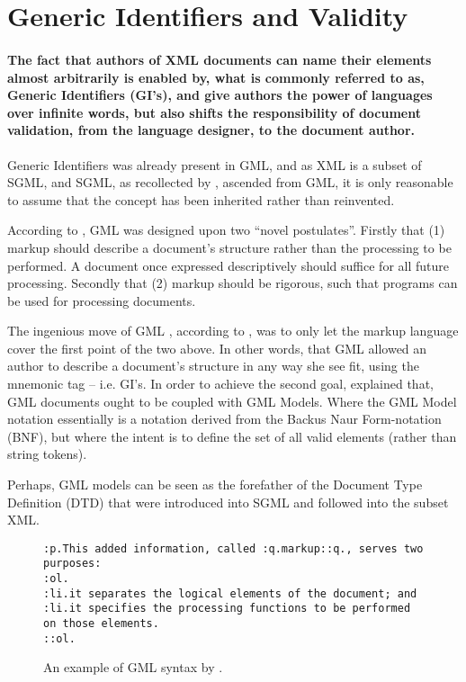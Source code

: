 \documentclass{scrreprt}
\begin{document}
\section{Generic Identifiers and Validity}
\label{sec:theory:generic-identifiers-and-validity}

\paragraph{The fact that authors of XML documents can name their elements almost arbitrarily is enabled by, what is commonly referred to as, Generic Identifiers (GI's), and give authors the power of languages over infinite words, but also shifts the responsibility of document validation, from the language designer, to the document author.}

Generic Identifiers was already present in GML, and as XML is a subset of SGML\citep{xmlFirstWorkingDraft}, and SGML, as recollected by \citet{goldfarbBlog}, ascended from GML, it is only reasonable to assume that the concept has been inherited rather than reinvented.

According to \citet{goldfarb}, GML was designed upon two ``novel postulates''. Firstly that (1) markup should describe a document's structure rather than the processing to be performed. A document once expressed descriptively should suffice for all future processing. Secondly that (2) markup should be rigorous, such that programs can be used for processing documents.


The ingenious move of GML , according to \citet{goldfarb}, was to only let the markup language cover the first point of the two above. In other words, that GML allowed an author to describe a document's structure in any way she see fit, using the mnemonic tag -- i.e. GI's. In order to achieve the second goal, \citet{goldfarb} explained that, GML documents ought to be coupled with GML Models. Where the GML Model notation essentially is a notation derived from the Backus Naur Form-notation (BNF), but where the intent is to define the set of all valid elements (rather than string tokens).

Perhaps, GML models can be seen as the forefather of the Document Type Definition (DTD) that were introduced into SGML and followed into the subset XML\citep{xmlFirstWorkingDraft}.

\begin{figure}[h]
\centering
\begin{lstlisting}
:p.This added information, called :q.markup::q., serves two purposes: 
:ol.
:li.it separates the logical elements of the document; and 
:li.it specifies the processing functions to be performed on those elements. 
::ol.
\end{lstlisting}
\caption{An example of GML syntax by \citet{goldfarb}.}
\end{figure}
\end{document}
